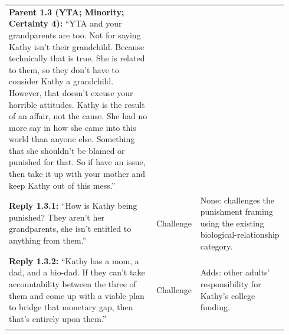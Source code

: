 \begin{table}[H]
\begin{tabular}{@{}p{0.52\linewidth}p{0.11\linewidth}p{0.31\linewidth}@{}}
\addlinespace[3pt]
\midrule
\textbf{Parent 1.3 (YTA; Minority; Certainty 4):} ``YTA and your grandparents are too. Not for saying Kathy isn't their grandchild. Because technically that is true. She is related to them, so they don't have to consider Kathy a grandchild.  However, that doesn't excuse your horrible attitudes. Kathy is the result of an affair, not the cause. She had no more say in how she came into this world than anyone else. Something that she shouldn't be blamed or punished for that. So if have an issue, then take it up with your mother and keep Kathy out of this mess.'' & & \\
\addlinespace[3pt]
\textbf{Reply 1.3.1:} ``How is Kathy being punished?  They aren't her grandparents, she isn't entitled to anything from them.'' & Challenge & None: challenges the punishment framing using the existing biological-relationship category. \\
\addlinespace[3pt]
\textbf{Reply 1.3.2:} ``Kathy has a mom, a dad, and a bio-dad. If they can't take accountability between the three of them and come up with a viable plan to bridge that monetary gap, then that's entirely upon them.'' & Challenge & Adds: other adults' responsibility for Kathy's college funding. \\
\addlinespace[3pt]
\bottomrule
\end{tabular}
\end{table}

